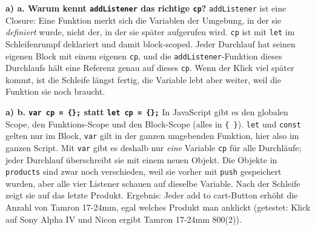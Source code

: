 \documentclass[11pt,a4paper]{article}
\begin{document}
\textbf{a) a. Warum kennt \texttt{addListener} das richtige
\texttt{cp}?} \texttt{addListener} ist eine Closure: Eine Funktion merkt
sich die Variablen der Umgebung, in der sie \emph{definiert} wurde, nicht
der, in der sie später aufgerufen wird. \texttt{cp} ist mit \texttt{let}
im Schleifenrumpf deklariert und damit block-scoped. Jeder Durchlauf hat
seinen eigenen Block mit einem eigenen \texttt{cp}, und die
\texttt{addListener}-Funktion dieses Durchlaufs hält eine Referenz genau
auf dieses \texttt{cp}. Wenn der Klick viel später kommt, ist die Schleife
längst fertig, die Variable lebt aber weiter, weil die Funktion sie noch
braucht.

\medskip
\textbf{a) b. \texttt{var cp = \{\};} statt \texttt{let cp = \{\};}}
In JavaScript gibt es den globalen Scope, den Funktions-Scope und den
Block-Scope (alles in \texttt{\{ \}}). \texttt{let} und \texttt{const}
gelten nur im Block, \texttt{var} gilt in der ganzen umgebenden Funktion,
hier also im ganzen Script. Mit \texttt{var} gibt es deshalb nur
\emph{eine} Variable \texttt{cp} für alle Durchläufe; jeder Durchlauf
überschreibt sie mit einem neuen Objekt. Die Objekte in \texttt{products}
sind zwar noch verschieden, weil sie vorher mit \texttt{push} gespeichert
wurden, aber alle vier Listener schauen auf dieselbe Variable. Nach der
Schleife zeigt sie auf das letzte Produkt. Ergebnis: Jeder
\glqq add to cart\grqq-Button erhöht die Anzahl von \glqq Tamron
17-24mm\grqq, egal welches Produkt man anklickt (getestet: Klick auf Sony
Alpha IV und Nicon ergibt \glqq Tamron 17-24mm 800(2)\grqq).
\end{document}
